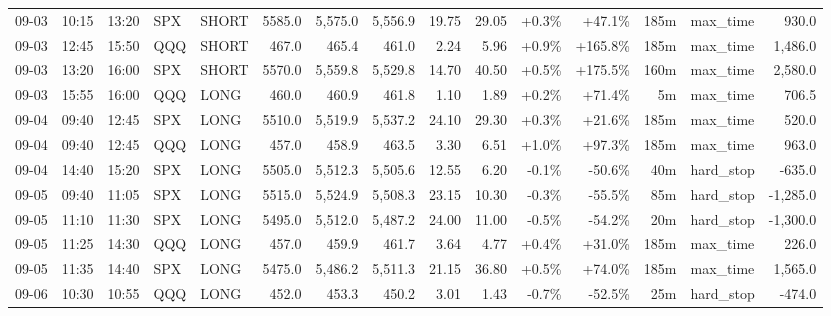 \documentclass[11pt,a4paper,twoside]{article}
\begin{document}
\begin{landscape}
\begin{center}
\begin{longtable}{>{\color{txtmain}}l l l l l r r r r r r r r >{\color{txtmain}}l r}
09-03 & 10:15 & 13:20 & SPX & SHORT & 5585.0 & 5,575.0 & 5,556.9 & 19.75 & 29.05 & \textcolor{wingreen}{+0.3\%} & \textcolor{wingreen}{+47.1\%} & 185m & max\_time & \textcolor{wingreen}{930.0} \\
09-03 & 12:45 & 15:50 & QQQ & SHORT & 467.0 & 465.4 & 461.0 & 2.24 & 5.96 & \textcolor{wingreen}{+0.9\%} & \textcolor{wingreen}{+165.8\%} & 185m & max\_time & \textcolor{wingreen}{1,486.0} \\
09-03 & 13:20 & 16:00 & SPX & SHORT & 5570.0 & 5,559.8 & 5,529.8 & 14.70 & 40.50 & \textcolor{wingreen}{+0.5\%} & \textcolor{wingreen}{+175.5\%} & 160m & max\_time & \textcolor{wingreen}{2,580.0} \\
09-03 & 15:55 & 16:00 & QQQ & LONG & 460.0 & 460.9 & 461.8 & 1.10 & 1.89 & \textcolor{wingreen}{+0.2\%} & \textcolor{wingreen}{+71.4\%} & 5m & max\_time & \textcolor{wingreen}{706.5} \\
09-04 & 09:40 & 12:45 & SPX & LONG & 5510.0 & 5,519.9 & 5,537.2 & 24.10 & 29.30 & \textcolor{wingreen}{+0.3\%} & \textcolor{wingreen}{+21.6\%} & 185m & max\_time & \textcolor{wingreen}{520.0} \\
09-04 & 09:40 & 12:45 & QQQ & LONG & 457.0 & 458.9 & 463.5 & 3.30 & 6.51 & \textcolor{wingreen}{+1.0\%} & \textcolor{wingreen}{+97.3\%} & 185m & max\_time & \textcolor{wingreen}{963.0} \\
09-04 & 14:40 & 15:20 & SPX & LONG & 5505.0 & 5,512.3 & 5,505.6 & 12.55 & 6.20 & \textcolor{lossred}{-0.1\%} & \textcolor{lossred}{-50.6\%} & 40m & hard\_stop & \textcolor{lossred}{-635.0} \\
09-05 & 09:40 & 11:05 & SPX & LONG & 5515.0 & 5,524.9 & 5,508.3 & 23.15 & 10.30 & \textcolor{lossred}{-0.3\%} & \textcolor{lossred}{-55.5\%} & 85m & hard\_stop & \textcolor{lossred}{-1,285.0} \\
09-05 & 11:10 & 11:30 & SPX & LONG & 5495.0 & 5,512.0 & 5,487.2 & 24.00 & 11.00 & \textcolor{lossred}{-0.5\%} & \textcolor{lossred}{-54.2\%} & 20m & hard\_stop & \textcolor{lossred}{-1,300.0} \\
09-05 & 11:25 & 14:30 & QQQ & LONG & 457.0 & 459.9 & 461.7 & 3.64 & 4.77 & \textcolor{wingreen}{+0.4\%} & \textcolor{wingreen}{+31.0\%} & 185m & max\_time & \textcolor{wingreen}{226.0} \\
09-05 & 11:35 & 14:40 & SPX & LONG & 5475.0 & 5,486.2 & 5,511.3 & 21.15 & 36.80 & \textcolor{wingreen}{+0.5\%} & \textcolor{wingreen}{+74.0\%} & 185m & max\_time & \textcolor{wingreen}{1,565.0} \\
09-06 & 10:30 & 10:55 & QQQ & LONG & 452.0 & 453.3 & 450.2 & 3.01 & 1.43 & \textcolor{lossred}{-0.7\%} & \textcolor{lossred}{-52.5\%} & 25m & hard\_stop & \textcolor{lossred}{-474.0} \\

\end{longtable}
\end{center}
\end{landscape}
\end{document}
